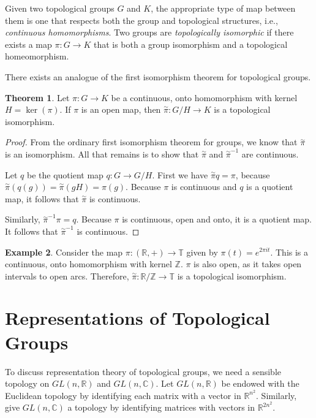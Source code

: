 \documentclass[12pt, a4paper]{article}
\theoremstyle{definition}
\newtheorem{theorem}{Theorem}[section]
\newtheorem{example}[theorem]{Example}
\begin{document}
Given two topological groups $G$ and $K$, the appropriate type of map between them is one that respects both the group and topological structures, i.e., \emph{continuous homomorphisms}. Two groups are \emph{topologically isomorphic} if there exists a map $\pi : G \to K$ that is both a group isomorphism and a topological homeomorphism.

There exists an analogue of the first isomorphism theorem for topological groups.

\begin{theorem}
Let $\pi : G \to K$ be a continuous, onto homomorphism with kernel $H =
\ker(\pi)$. If $\pi$ is an open map, then $\overset{\sim}{\pi} : G/H
\to K$ is a topological isomorphism.
\end{theorem}
\begin{proof}
From the ordinary first isomorphism theorem for groups, we know that $\overset{\sim}{\pi}$ is an isomorphism. All that remains is to show that $\overset{\sim}{\pi}$ and $\overset{\sim}{\pi}^{-1}$ are continuous.

Let $q$ be the quotient map $q : G \to G/H$. First we have $\overset{\sim}{\pi} q = \pi$, because $\overset{\sim}{\pi}(q(g)) = \overset{\sim}{\pi}(gH) = \pi(g)$. Because $\pi$ is continuous and $q$ is a quotient map, it follows that $\overset{\sim}{\pi}$ is continuous.

Similarly, $\overset{\sim}{\pi}^{-1} \pi = q$. Because $\pi$ is continuous, open and onto, it is a quotient map. It follows that $\overset{\sim}{\pi}^{-1}$ is continuous.
\end{proof}

\begin{example}
Consider the map $\pi : (\mathbb{R}, +) \to \mathbb{T}$ given by $\pi(t) = e^{2 \pi i t}$. This is a continuous, onto homomorphism with kernel $\mathbb{Z}$. $\pi$ is also open, as it takes open intervals to open arcs. Therefore, $\overset{\sim}{\pi} : \mathbb{R}/\mathbb{Z} \to \mathbb{T}$ is a topological isomorphism.
\end{example}

\section{Representations of Topological Groups}

To discuss representation theory of topological groups, we need a sensible topology on $GL(n, \mathbb{R})$ and $GL(n, \mathbb{C})$. Let $GL(n, \mathbb{R})$ be endowed with the Euclidean topology by identifying each matrix with a vector in $\mathbb{R}^{n^2}$. Similarly, give $GL(n, \mathbb{C})$ a topology by identifying matrices with vectors in $\mathbb{R}^{2n^2}$.
\end{document}
